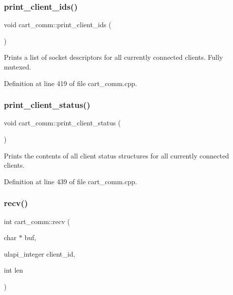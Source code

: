 \subsubsection{\texorpdfstring{print\+\_\+client\+\_\+ids()}{print\_client\_ids()}}
{\footnotesize\ttfamily void cart\+\_\+comm\+::print\+\_\+client\+\_\+ids (\begin{DoxyParamCaption}{ }\end{DoxyParamCaption})}

Prints a list of socket descriptors for all currently connected clients. Fully mutexed. 

Definition at line 419 of file cart\+\_\+comm.\+cpp.

\mbox{\label{classcart__comm_a46b117a719b4844c97b570229c82cbc8}} 
\subsubsection{\texorpdfstring{print\+\_\+client\+\_\+status()}{print\_client\_status()}}
{\footnotesize\ttfamily void cart\+\_\+comm\+::print\+\_\+client\+\_\+status (\begin{DoxyParamCaption}{ }\end{DoxyParamCaption})}

Prints the contents of all client status structures for all currently connected clients. 

Definition at line 439 of file cart\+\_\+comm.\+cpp.

\mbox{\label{classcart__comm_ab7f3cc745c6935abadf38a87a00740c8}} 
\subsubsection{\texorpdfstring{recv()}{recv()}}
{\footnotesize\ttfamily int cart\+\_\+comm\+::recv (\begin{DoxyParamCaption}\item[{char $\ast$}]{buf,  }\item[{ulapi\+\_\+integer}]{client\+\_\+id,  }\item[{int}]{len }\end{DoxyParamCaption})}

